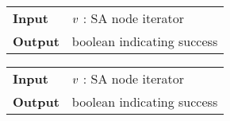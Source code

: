 \begin{figure*}[t!]
\begin{minipage}[t]{.5\textwidth}
\begin{algorithm}[H]
\begin{tabular}{ll}
\textbf{Input}  & $v$ : SA node iterator\\
\textbf{Output} & boolean indicating success\\
\end{tabular}
\begin{algorithmic}[1]
	\State \Return \False
\EndIf
{}
\EndIf
{}
\State \Return \True
\end{algorithmic}
\label{alg:sa-godown}
\end{algorithm}
\end{minipage}
\hfill
\begin{minipage}[t]{.5\textwidth}
\begin{algorithm}[H]
\begin{tabular}{ll}
\textbf{Input}  & $v$ : SA node iterator\\
\textbf{Output} & boolean indicating success\\
\end{tabular}
\begin{algorithmic}[1]
	\State \Return \False
\EndIf
{}
\EndIf
\State \Return \True
\item[]
\end{algorithmic}
\label{alg:sa-goright}
\end{algorithm}
\end{minipage}
\end{figure*}

